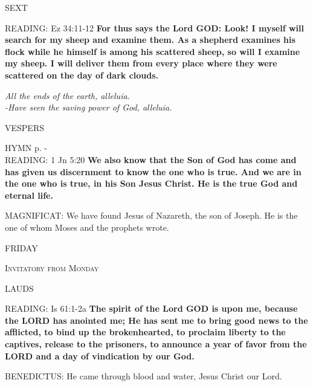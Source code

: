 \begin{flushleft}\normalsize{\uppercase{SEXT\\}}\end{flushleft}
\noindent\small{\uppercase{READING:}}    Ez 34:11-12 \textbf{   For thus says the Lord GOD: Look! I myself will search for my sheep and examine them. As a shepherd examines his flock while he himself is among his scattered sheep, so will I examine my sheep. I will deliver them from every place where they were scattered on the day of dark clouds.}
\begin{center}\textit{All the ends of the earth, alleluia.\\
-Have seen the saving power of God, alleluia.}\end{center}

\begin{flushleft}\normalsize{\uppercase{VESPERS\\}}\end{flushleft}
\small{\uppercase{HYMN} p. \pageref{christmas:firstHymn}-\pageref{christmas:lastHymn}\\}
\noindent\small{\uppercase{READING:}}    1 Jn 5:20 \textbf{   We also know that the Son of God has come and has given us discernment to know the one who is true. And we are in the one who is true, in his Son Jesus Christ. He is the true God and eternal life.\\}

\noindent\small{\uppercase{MAGNIFICAT:}}	We have found Jesus of Nazareth, the son of Joseph. He is the one of whom Moses and the prophets wrote.

\begin{center}
\normalsize FRIDAY
\end{center}

\noindent\textsc{Invitatory from Monday}
\begin{flushleft}\normalsize{\uppercase{LAUDS\\}}\end{flushleft}
\noindent\small{\uppercase{READING:}}    Is 61:1-2a    \textbf{The spirit of the Lord GOD is upon me, because the LORD has anointed me; He has sent me to bring good news to the afflicted, to bind up the brokenhearted, to proclaim liberty to the captives, release to the prisoners, to announce a year of favor from the LORD and a day of vindication by our God.\\}

\noindent\small{\uppercase{BENEDICTUS:}}	He came through blood and water, Jesus Christ our Lord.\\

